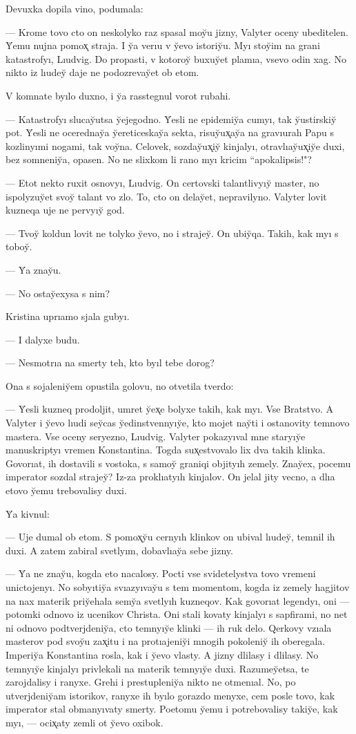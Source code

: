 \documentclass[10pt]{book}
\begin{document}
Devuxka dopila vino, podumala:

— Krome tovo cto on neskolyko raz spasal moy̆u jizny, Valyter oceny ubeditelen. Y̆emu nujna pomox̨ straja. I y̆a verıu v y̆evo istoriy̆u. Myı stoy̆im na grani katastrofyı, Lıudvig. Do propasti, v kotoroy̆ buxuy̆et plamıa, vsevo odin xag. No nikto iz lıudey̆ daje ne podozrevay̆et ob etom.

V komnate byılo duxno, i y̆a rasstegnul vorot rubahi.

— Katastrofyı slucay̆utsa y̆ejegodno. Y̆esli ne epidemiy̆a cumyı, tak y̆ustirskiy̆ pot. Y̆esli ne ocerednay̆a y̆ereticeskay̆a sekta, risuy̆ux̨ay̆a na gravıurah Papu s kozlinyımi nogami, tak voy̆na. Celovek, sozday̆ux̨iy̆ kinjalyı, otravlıay̆ux̨iy̆e duxi, bez somneniy̆a, opasen. No ne slixkom li rano myı kricim ``apokalipsis!"?

— Etot nekto ruxit osnovyı, Lıudvig. On certovski talantlivyıy̆ master, no ispolyzuy̆et svoy̆ talant vo zlo. To, cto on delay̆et, nepravilyno. Valyter lovit kuzneqa uje ne pervyıy̆ god.

— Tvoy̆ koldun lovit ne tolyko y̆evo, no i strajey̆. On ubiy̆qa. Takih, kak myı s toboy̆.

— Y̆a znay̆u.

— No ostay̆exysa s nim?

Kristina uprıamo sjala gubyı.

— I dalyxe budu.

— Nesmotrıa na smerty teh, kto byıl tebe dorog?

Ona s sojaleniy̆em opustila golovu, no otvetila tverdo:

— Y̆esli kuzneq prodoljit, umret y̆ex̨e bolyxe takih, kak myı. Vse Bratstvo. A Valyter i y̆evo lıudi sey̆cas y̆edinstvennyıy̆e, kto mojet nay̆ti i ostanovity temnovo mastera. Vse oceny seryezno, Lıudvig. Valyter pokazyıval mne staryıy̆e manuskriptyı vremen Konstantina. Togda sux̨estvovalo lix dva takih klinka. Govorıat, ih dostavili s vostoka, s samoy̆ graniqi objityıh zemely. Znay̆ex, pocemu imperator sozdal strajey̆? Iz-za proklıatyıh kinjalov. On jelal jity vecno, a dlıa etovo y̆emu trebovalisy duxi.

Y̆a kivnul:

— Uje dumal ob etom. S pomox̨y̆u cernyıh klinkov on ubival lıudey̆, temnil ih duxi. A zatem zabiral svetlyım, dobavlıay̆a sebe jizny.

— Y̆a ne znay̆u, kogda eto nacalosy. Pocti vse svidetelystva tovo vremeni unictojenyı. No sobyıtiy̆a svıazyıvay̆u s tem momentom, kogda iz zemely hagjitov na nax materik priy̆ehala semy̆a svetlyıh kuzneqov. Kak govorıat legendyı, oni — potomki odnovo iz ucenikov Christa. Oni stali kovaty kinjalyı s sapfirami, no net ni odnovo podtverjdeniy̆a, cto temnyıy̆e klinki — ih ruk delo. Qerkovy vzıala masterov pod svoy̆u zax̨itu i na protıajeniy̆i mnogih pokoleniy̆ ih oberegala. Imperiy̆a Konstantina rosla, kak i y̆evo vlasty. A jizny dlilasy i dlilasy. No temnyıy̆e kinjalyı privlekali na materik temnyıy̆e duxi. Razumey̆etsa, te zarojdalisy i ranyxe. Grehi i prestupleniy̆a nikto ne otmenıal. No, po utverjdeniy̆am istorikov, ranyxe ih byılo gorazdo menyxe, cem posle tovo, kak imperator stal obmanyıvaty smerty. Poetomu y̆emu i potrebovalisy takiy̆e, kak myı, — ocix̨aty zemli ot y̆evo oxibok.
\end{document}
